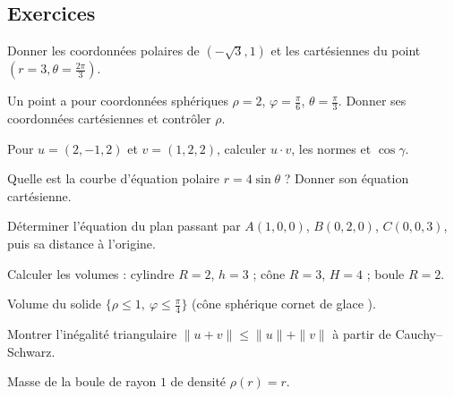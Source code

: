 \subsection{Exercices}
\begin{exo}[A]\label{c5e1}
Donner les coordonnées polaires de $(-\sqrt3,1)$ et les cartésiennes du point $(r=3,\theta=\frac{2\pi}3)$.
\end{exo}
\begin{exo}[A]\label{c5e2}
Un point a pour coordonnées sphériques $\rho=2$, $\varphi=\frac\pi6$, $\theta=\frac\pi3$. Donner ses coordonnées cartésiennes et contrôler $\rho$.
\end{exo}
\begin{exo}[A]\label{c5e3}
Pour $u=(2,-1,2)$ et $v=(1,2,2)$, calculer $u\cdot v$, les normes et $\cos\gamma$.
\end{exo}
\begin{exo}[B]\label{c5e4}
Quelle est la courbe d'équation polaire $r=4\sin\theta$ ? Donner son équation cartésienne.
\end{exo}
\begin{exo}[B]\label{c5e5}
Déterminer l'équation du plan passant par $A(1,0,0)$, $B(0,2,0)$, $C(0,0,3)$, puis sa distance à l'origine.
\end{exo}
\begin{exo}[B]\label{c5e6}
Calculer les volumes : cylindre $R=2$, $h=3$ ; cône $R=3$, $H=4$ ; boule $R=2$.
\end{exo}
\begin{exo}[C]\label{c5e7}
Volume du solide $\{\rho\le1,\ \varphi\le\frac\pi4\}$ (cône sphérique \og cornet de glace \fg{}).
\end{exo}
\begin{exo}[C]\label{c5e8}
Montrer l'inégalité triangulaire $\|u+v\|\le\|u\|+\|v\|$ à partir de Cauchy--Schwarz.
\end{exo}
\begin{exo}[C]\label{c5e9}
Masse de la boule de rayon $1$ de densité $\rho(r)=r$.
\end{exo}

\ifcorr
